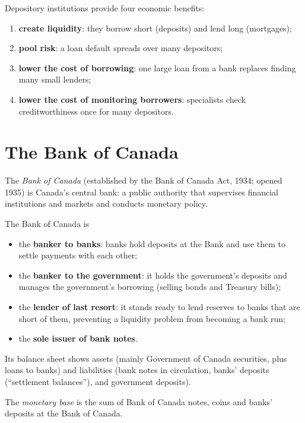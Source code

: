 Depository institutions provide four economic benefits:
\begin{enumerate}
  \item \textbf{create liquidity}: they borrow short (deposits) and lend long (mortgages);
  \item \textbf{pool risk}: a loan default spreads over many depositors;
  \item \textbf{lower the cost of borrowing}: one large loan from a bank replaces finding
        many small lenders;
  \item \textbf{lower the cost of monitoring borrowers}: specialists check
        creditworthiness once for many depositors.
\end{enumerate}

\section{The Bank of Canada}

\begin{definition}
The \emph{Bank of Canada} (established by the Bank of Canada Act, 1934; opened 1935) is
Canada's central bank: a public authority that supervises financial institutions and
markets and conducts monetary policy.
\end{definition}

The Bank of Canada is
\begin{itemize}
  \item the \textbf{banker to banks}: banks hold deposits at the Bank and use them to
        settle payments with each other;
  \item the \textbf{banker to the government}: it holds the government's deposits and
        manages the government's borrowing (selling bonds and Treasury bills);
  \item the \textbf{lender of last resort}: it stands ready to lend reserves to banks that
        are short of them, preventing a liquidity problem from becoming a bank run;
  \item the \textbf{sole issuer of bank notes}.
\end{itemize}

Its balance sheet shows assets (mainly Government of Canada securities, plus loans to
banks) and liabilities (bank notes in circulation, banks' deposits (``settlement
balances''), and government deposits).

\begin{definition}
The \emph{monetary base} is the sum of Bank of Canada notes, coins and banks' deposits at
the Bank of Canada.
\end{definition}

